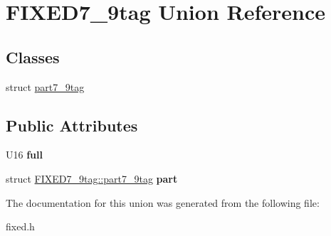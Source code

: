 \hypertarget{union_f_i_x_e_d7__9tag}{
\section{FIXED7\_\-9tag Union Reference}
\label{union_f_i_x_e_d7__9tag}
}
\subsection*{Classes}
\begin{DoxyCompactItemize}
\item 
struct \hyperlink{struct_f_i_x_e_d7__9tag_1_1part7__9tag}{part7\_\-9tag}
\end{DoxyCompactItemize}
\subsection*{Public Attributes}
\begin{DoxyCompactItemize}
\item 
\hypertarget{union_f_i_x_e_d7__9tag_afeadf5458af2daddbf68b0ff84e8cb3b}{
U16 {\bfseries full}}
\label{union_f_i_x_e_d7__9tag_afeadf5458af2daddbf68b0ff84e8cb3b}

\item 
\hypertarget{union_f_i_x_e_d7__9tag_ad69009e24d47b2a9088f68ab0f4f7185}{
struct \hyperlink{struct_f_i_x_e_d7__9tag_1_1part7__9tag}{FIXED7\_\-9tag::part7\_\-9tag} {\bfseries part}}
\label{union_f_i_x_e_d7__9tag_ad69009e24d47b2a9088f68ab0f4f7185}

\end{DoxyCompactItemize}


The documentation for this union was generated from the following file:\begin{DoxyCompactItemize}
\item 
fixed.h\end{DoxyCompactItemize}
